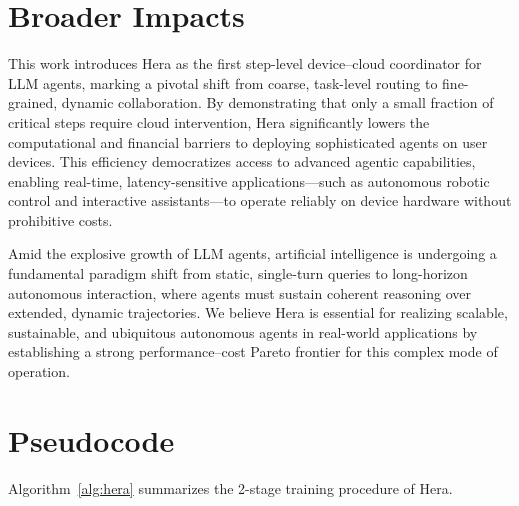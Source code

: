 \documentclass{article}
\newcommand{\name}{Hera\xspace}
\begin{document}
{\small


}


\newpage
\appendix


\section{Broader Impacts}
\label{appendix:impact}

This work introduces \name as the first step-level device--cloud coordinator for LLM agents, marking a pivotal shift from coarse, task-level routing to fine-grained, dynamic collaboration. By demonstrating that only a small fraction of critical steps require cloud intervention, \name significantly lowers the computational and financial barriers to deploying sophisticated agents on user devices. This efficiency democratizes access to advanced agentic capabilities, enabling real-time, latency-sensitive applications—such as autonomous robotic control and interactive assistants—to operate reliably on device hardware without prohibitive costs.

Amid the explosive growth of LLM agents, artificial intelligence is undergoing a fundamental paradigm shift from static, single-turn queries to long-horizon autonomous interaction, where agents must sustain coherent reasoning over extended, dynamic trajectories. We believe \name is essential for realizing scalable, sustainable, and ubiquitous autonomous agents in real-world applications by establishing a strong performance--cost Pareto frontier for this complex mode of operation.

\section{Pseudocode}
\label{append:code}

Algorithm~\ref{alg:hera} summarizes the 2-stage training procedure of \name.
\end{document}
